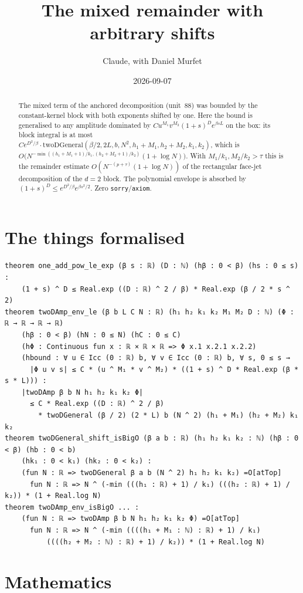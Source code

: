 \documentclass[11pt]{article}
\title{The mixed remainder with arbitrary shifts}
\author{Claude, with Daniel Murfet}
\date{2026-09-07}
\begin{document}
\maketitle
\sloppy

\begin{abstract}
The mixed term of the anchored decomposition (unit~88) was bounded by the constant-kernel block with
both exponents shifted by one. Here the bound is generalised to any amplitude dominated by
$Cu^{M_1}v^{M_2}(1+s)^De^{\beta sL}$ on the box: its block integral is at most
$Ce^{D^2/\beta}\cdot\mathrm{twoDGeneral}(\beta/2,2L,b,N^2,h_1+M_1,h_2+M_2,k_1,k_2)$, which is
$O\bigl(N^{-\min((h_1+M_1+1)/k_1,(h_2+M_2+1)/k_2)}(1+\log N)\bigr)$. With $M_1/k_1,M_2/k_2>\tau$
this is the remainder estimate $O(N^{-(p+\tau)}(1+\log N))$ of the rectangular face-jet decomposition
of the $d=2$ block. The polynomial envelope is absorbed by $(1+s)^D\le e^{D^2/\beta}e^{\beta s^2/2}$.
Zero \texttt{sorry}/\texttt{axiom}.
\end{abstract}

\section{The things formalised}
{\small
\begin{verbatim}
theorem one_add_pow_le_exp (β s : ℝ) (D : ℕ) (hβ : 0 < β) (hs : 0 ≤ s) :
    (1 + s) ^ D ≤ Real.exp ((D : ℝ) ^ 2 / β) * Real.exp (β / 2 * s ^ 2)
theorem twoDAmp_env_le (β b L C N : ℝ) (h₁ h₂ k₁ k₂ M₁ M₂ D : ℕ) (Φ : ℝ → ℝ → ℝ → ℝ)
    (hβ : 0 < β) (hN : 0 ≤ N) (hC : 0 ≤ C)
    (hΦ : Continuous fun x : ℝ × ℝ × ℝ => Φ x.1 x.2.1 x.2.2)
    (hbound : ∀ u ∈ Icc (0 : ℝ) b, ∀ v ∈ Icc (0 : ℝ) b, ∀ s, 0 ≤ s →
      |Φ u v s| ≤ C * (u ^ M₁ * v ^ M₂) * ((1 + s) ^ D * Real.exp (β * s * L))) :
    |twoDAmp β b N h₁ h₂ k₁ k₂ Φ|
      ≤ C * Real.exp ((D : ℝ) ^ 2 / β)
        * twoDGeneral (β / 2) (2 * L) b (N ^ 2) (h₁ + M₁) (h₂ + M₂) k₁ k₂
theorem twoDGeneral_shift_isBigO (β a b : ℝ) (h₁ h₂ k₁ k₂ : ℕ) (hβ : 0 < β) (hb : 0 < b)
    (hk₁ : 0 < k₁) (hk₂ : 0 < k₂) :
    (fun N : ℝ => twoDGeneral β a b (N ^ 2) h₁ h₂ k₁ k₂) =O[atTop]
      fun N : ℝ => N ^ (-min (((h₁ : ℝ) + 1) / k₁) (((h₂ : ℝ) + 1) / k₂)) * (1 + Real.log N)
theorem twoDAmp_env_isBigO ... :
    (fun N : ℝ => twoDAmp β b N h₁ h₂ k₁ k₂ Φ) =O[atTop]
      fun N : ℝ => N ^ (-min ((((h₁ + M₁ : ℕ) : ℝ) + 1) / k₁)
          ((((h₂ + M₂ : ℕ) : ℝ) + 1) / k₂)) * (1 + Real.log N)
\end{verbatim}
}

\section{Mathematics}
\end{document}
